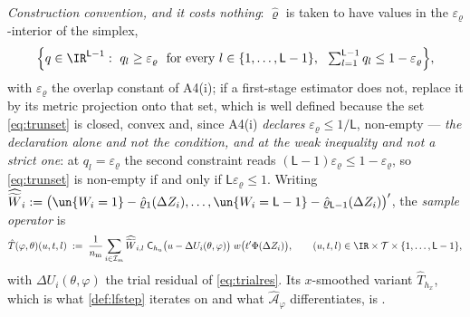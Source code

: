 \begin{definition}
\emph{Construction convention, and it costs nothing}: $\hat\varrho$ is taken to have values in the
$\varepsilon_\varrho$-interior of the simplex,
\begin{equation}\label{eq:trunset}
\Big\{q\in\IR^{\mathsf L-1}:\ q_l\ge\varepsilon_\varrho\ \text{ for every }l\in\{1,\dots,\mathsf L-1\},\ \ \textstyle\sum_{l=1}^{\mathsf L-1}q_l\le1-\varepsilon_\varrho\Big\},
\end{equation}
with $\varepsilon_\varrho$ the overlap constant of
A4(i); if a first-stage estimator does not, replace it by its metric projection onto that
set, which is well defined because the set \eqref{eq:trunset} is closed, convex and, since
A4(i) \emph{declares} $\varepsilon_\varrho\le1/\mathsf L$, non-empty --- \emph{the declaration alone and
not the condition, and at the weak inequality and not a strict one}: at $q_l=\varepsilon_\varrho$ the
second constraint reads $(\mathsf L-1)\varepsilon_\varrho\le1-\varepsilon_\varrho$, so
\eqref{eq:trunset} is non-empty if and only if $\mathsf L\varepsilon_\varrho\le1$.
Writing $\widehat{\widetilde W}_{i}:=\big(\un\{W_i=1\}-\hat\varrho_1(\Delta Z_i),\dots,\un\{W_i=\mathsf L-1\}-\hat\varrho_{\mathsf L-1}(\Delta Z_i)\big)'$,
the \emph{sample operator} is
\begin{equation}\label{eq:hatT}
\hat T(\varphi,\theta)(u,t,l)\;:=\;\frac1{n_{\mathrm m}}\sum_{i\in\mathcal I_m}
\widehat{\widetilde W}_{i,l}\;\mathsf C_{h_u}\big(u-\Delta U_i(\theta,\varphi)\big)\;w\big(t'\Phi(\Delta Z_i)\big),
\qquad(u,t,l)\in\IR\times\mathcal T\times\{1,\dots,\mathsf L-1\} ,
\end{equation}
with $\Delta U_i(\theta,\varphi)$ the trial residual of \eqref{eq:trialres}. Its $x$-smoothed variant
$\hat T_{h_x}$, which is what \cref{def:lfstep} iterates on and what
$\hat{\mathcal A}_\varphi$ differentiates, is .
\end{definition}

